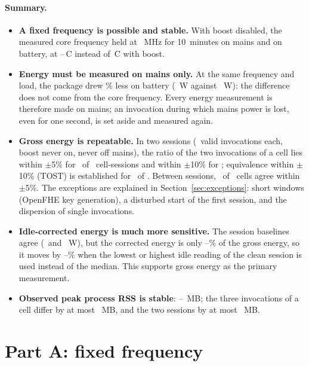 \documentclass[11pt]{article}
\begin{document}
\paragraph{Summary.}
\begin{itemize}[leftmargin=*, itemsep=2pt]
  \item \textbf{A fixed frequency is possible and stable.} With boost disabled, the measured core frequency held at \freqAMains~MHz for 10~minutes on mains and on battery, at \tempABattery--\tempAMains\,\textdegree C instead of \tempAOn\,\textdegree C with boost.
  \item \textbf{Energy must be measured on mains only.} At the same frequency and load, the package drew \powDropA\% less on battery (\powABattery~W against \powAMains~W): the difference does not come from the core frequency. Every energy measurement is therefore made on mains; an invocation during which mains power is lost, even for one second, is set aside and measured again.
  \item \textbf{Gross energy is repeatable.} In two sessions (\nInvPerSession\ valid invocations each, boost never on, never off mains), the ratio of the two invocations of a cell lies within $\pm$5\% for \nRatioFive\ of \nCellsSess\ cell-sessions and within $\pm$10\% for \nRatioTen; equivalence within $\pm$10\% (TOST) is established for \nEquiv\ of \nCellsSess. Between sessions, \nAcrossFive\ of \nAcross\ cells agree within $\pm$5\%. The exceptions are explained in Section~\ref{sec:exceptions}: short windows (OpenFHE key generation), a disturbed start of the first session, and the dispersion of single invocations.
  \item \textbf{Idle-corrected energy is much more sensitive.} The session baselines agree (\baseOne\ and \baseTwo~W), but the corrected energy is only \shareMin--\shareMax\% of the gross energy, so it moves by \sensMinTwo--\sensMaxTwo\% when the lowest or highest idle reading of the clean session is used instead of the median. This supports gross energy as the primary measurement.
  \item \textbf{Observed peak process RSS is stable}: \rssMin--\rssMax~MB; the three invocations of a cell differ by at most \rssRangeMax~MB, and the two sessions by at most \rssAcrossMax~MB.
\end{itemize}

\section{Part A: fixed frequency}
\end{document}
